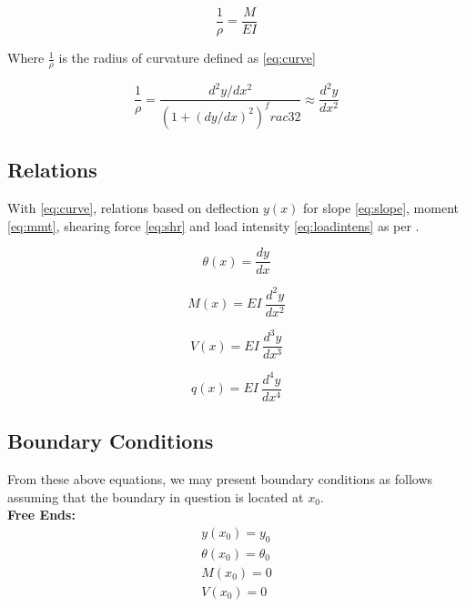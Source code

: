 \begin{equation}
	\label{eq:Mcurve}
	\frac{1}{\rho}=\frac{M}{EI}
\end{equation}

Where $\frac{1}{\rho}$ is the radius of curvature defined as \ref{eq:curve}

\begin{equation}
	\label{eq:curve}
	\frac{1}{\rho}=\frac{d^2y/dx^2}{\left( 1 +(dy/dx)^2 \right)^frac{3}{2}} \approx \frac{d^2y}{dx^2}
\end{equation}

\subsection{Relations}

With \ref{eq:curve}, relations based on deflection $y(x)$ for slope \ref{eq:slope}, moment \ref{eq:mmt}, shearing force \ref{eq:shr} and load intensity \ref{eq:loadintens} as per \citep{nisbett2014shigley}.

\begin{equation}
	\label{eq:slope}
	\theta(x) = \frac{dy}{dx}
\end{equation}

\begin{equation}
	\label{eq:mmt}
	M(x) = EI\ \frac{d^2y}{dx^2}
\end{equation}

\begin{equation}
	\label{eq:shr}
	V(x) = EI\ \frac{d^3y}{dx^3}
\end{equation}

\begin{equation}
	\label{eq:loadintens}
	q(x) = EI\ \frac{d^4y}{dx^4}
\end{equation}

\subsection{Boundary Conditions}

From these above equations, we may present boundary conditions as follows assuming that the boundary in question is located at $x_0$.\\

\textbf{Free Ends:}\\
\begin{equation}
	\label{eq:freeBC}
	\begin{aligned}
	y(x_0) = y_0 \\
	\theta(x_0)= \theta_0\\
	M(x_0) = 0\\
	V(x_0) = 0 
	\end{aligned}
\end{equation}

